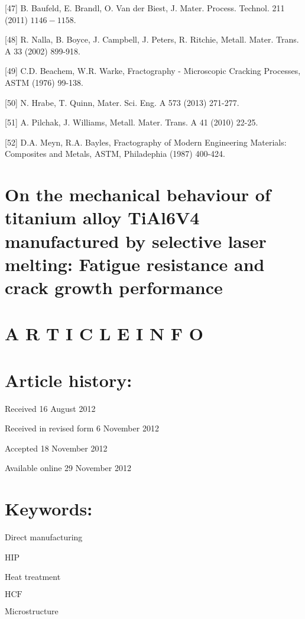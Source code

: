 \documentclass[10pt]{article}
\begin{document}
[47] B. Baufeld, E. Brandl, O. Van der Biest, J. Mater. Process. Technol. 211 (2011) $1146-1158$.

[48] R. Nalla, B. Boyce, J. Campbell, J. Peters, R. Ritchie, Metall. Mater. Trans. A 33 (2002) 899-918.

[49] C.D. Beachem, W.R. Warke, Fractography - Microscopic Cracking Processes, ASTM (1976) 99-138.

[50] N. Hrabe, T. Quinn, Mater. Sci. Eng. A 573 (2013) 271-277.

[51] A. Pilchak, J. Williams, Metall. Mater. Trans. A 41 (2010) 22-25.

[52] D.A. Meyn, R.A. Bayles, Fractography of Modern Engineering Materials: Composites and Metals, ASTM, Philadephia (1987) 400-424.

\section*{On the mechanical behaviour of titanium alloy TiAl6V4 manufactured by selective laser melting: Fatigue resistance and crack growth performance }


\section*{A R T I C L E I N F O}
\section*{Article history:}
Received 16 August 2012

Received in revised form 6 November 2012

Accepted 18 November 2012

Available online 29 November 2012

\section*{Keywords:}
Direct manufacturing

HIP

Heat treatment

$\mathrm{HCF}$

Microstructure
\end{document}
